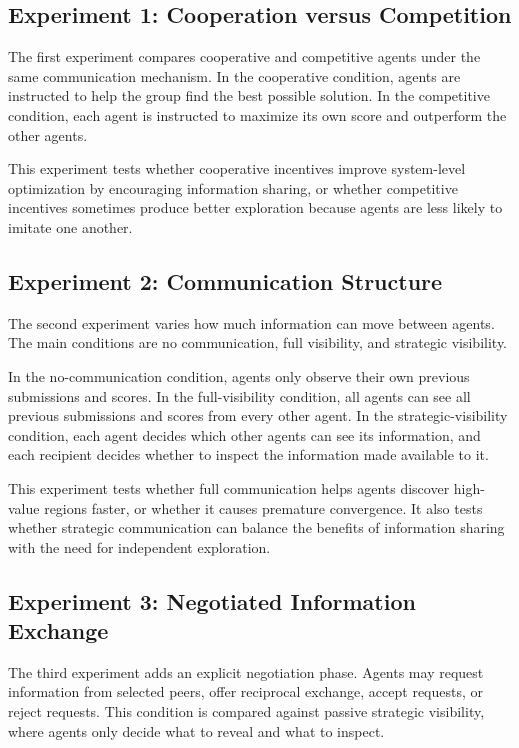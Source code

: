 \documentclass[11pt]{article}
\begin{document}
\subsection{Experiment 1: Cooperation versus Competition}

The first experiment compares cooperative and competitive agents under the same communication mechanism. In the cooperative condition, agents are instructed to help the group find the best possible solution. In the competitive condition, each agent is instructed to maximize its own score and outperform the other agents.

This experiment tests whether cooperative incentives improve system-level optimization by encouraging information sharing, or whether competitive incentives sometimes produce better exploration because agents are less likely to imitate one another.

\subsection{Experiment 2: Communication Structure}

The second experiment varies how much information can move between agents. The main conditions are no communication, full visibility, and strategic visibility.

In the no-communication condition, agents only observe their own previous submissions and scores. In the full-visibility condition, all agents can see all previous submissions and scores from every other agent. In the strategic-visibility condition, each agent decides which other agents can see its information, and each recipient decides whether to inspect the information made available to it.

This experiment tests whether full communication helps agents discover high-value regions faster, or whether it causes premature convergence. It also tests whether strategic communication can balance the benefits of information sharing with the need for independent exploration.

\subsection{Experiment 3: Negotiated Information Exchange}

The third experiment adds an explicit negotiation phase. Agents may request information from selected peers, offer reciprocal exchange, accept requests, or reject requests. This condition is compared against passive strategic visibility, where agents only decide what to reveal and what to inspect.
\end{document}
